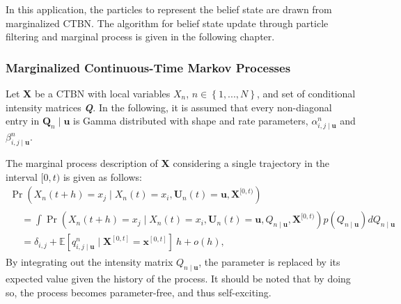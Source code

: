 In this application, the particles to represent the belief state are drawn from marginalized CTBN. The algorithm for belief state update through particle filtering and marginal process is given in the following chapter.
\subsubsection{Marginalized Continuous-Time Markov Processes}
Let \textbf{X} be a CTBN with local variables $ X_n $, $ n\in \left\lbrace 1,...,N \right\rbrace $, and set of conditional intensity matrices \textbf{\textit{Q}}. In the following, it is assumed that every non-diagonal entry in $ \textbf{Q}_{n}\mid \textbf{u} $ is Gamma distributed with shape and rate parameters, $ \alpha^n_{i,j\mid \textbf{u}} $ and $ \beta^n_{i,j\mid \textbf{u}} $.

The marginal process description of \textbf{X} considering a single trajectory in the interval $ [0,t) $ is given as follows:
\begin{multline}
\operatorname{Pr}(X_n(t + h) = x_j \mid X_n(t)=x_i, \textbf{U}_n(t)=\textbf{u}, \textbf{X}^{[0, t)})\\
\begin{split}
&= \int \operatorname{Pr}(X_n(t + h) = x_j \mid X_n(t)=x_i, \textbf{U}_n(t)=\textbf{u}, Q_{n\mid \textbf{u}}, \textbf{X}^{[0, t)})p(Q_{n\mid \textbf{u}})dQ_{n\mid \textbf{u}}\\
&= \delta_{i,j} + \mathbb{E}[q^n_{i,j\mid \textbf{u}} \mid \textbf{X}^{[0, t]} = \textbf{x}^{[0, t]}]\ h + o(h),
\end{split}
\label{eq:marginal_CTBN}
\end{multline}
By integrating out the intensity matrix $ Q_{n\mid \textbf{u}} $, the parameter is replaced by its expected value given the history of the process. It should be noted that by doing so, the process becomes parameter-free, and thus self-exciting. 

